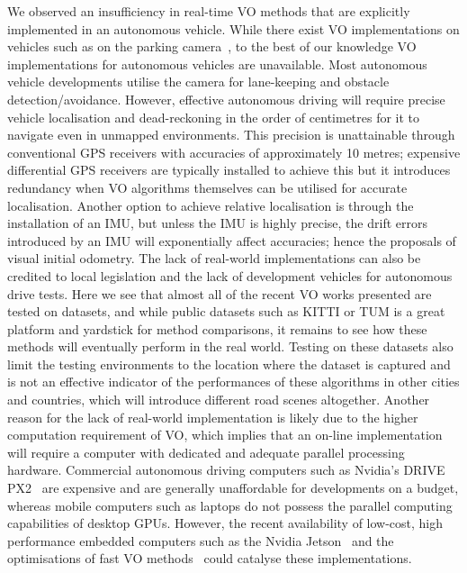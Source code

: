 We observed an insufficiency in real-time VO methods that are explicitly implemented in an autonomous vehicle. While there exist VO implementations on vehicles such as on the parking camera~\cite{lovegrove_accurate_2011}, to the best of our knowledge VO implementations for autonomous vehicles are unavailable. Most autonomous vehicle developments utilise the camera for lane-keeping and obstacle detection/avoidance. However, effective autonomous driving will require precise vehicle localisation and dead-reckoning in the order of centimetres for it to navigate even in unmapped environments. This precision is unattainable through conventional GPS receivers with accuracies of approximately 10 metres; expensive differential GPS receivers are typically installed to achieve this but it introduces redundancy when VO algorithms themselves can be utilised for accurate localisation. Another option to achieve relative localisation is through the installation of an IMU, but unless the IMU is highly precise, the drift errors introduced by an IMU will exponentially affect accuracies; hence the proposals of visual initial odometry. The lack of real-world implementations can also be credited to local legislation and the lack of development vehicles for autonomous drive tests. Here we see that almost all of the recent VO works presented are tested on datasets, and while public datasets such as KITTI or TUM is a great platform and yardstick for method comparisons, it remains to see how these methods will eventually perform in the real world. Testing on these datasets also limit the testing environments to the location where the dataset is captured and is not an effective indicator of the performances of these algorithms in other cities and countries, which will introduce different road scenes altogether. Another reason for the lack of real-world implementation is likely due to the higher computation requirement of VO, which implies that an on-line implementation will require a computer with dedicated and adequate parallel processing hardware. Commercial autonomous driving computers such as Nvidia's DRIVE PX2~\cite{nvidia_corporation_autonomous_nodate} are expensive and are generally unaffordable for developments on a budget, whereas mobile computers such as laptops do not possess the parallel computing capabilities of desktop GPUs. However, the recent availability of low-cost, high performance embedded computers such as the Nvidia Jetson~\cite{nvidia_corporation_embedded_2017-1} and the optimisations of fast VO methods~\cite{jaimez_fast_2017, jaimez_fast_2015, steinbrucker_real-time_2011, sun_robust_2018, wu_framework_2017} could catalyse these implementations. 

